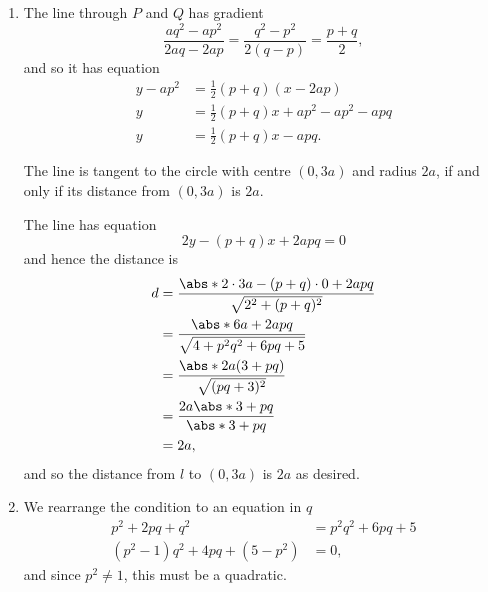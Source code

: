 \Question{\currfilebase}

\begin{enumerate}
    \item The line through \(P\) and \(Q\) has gradient
          \[
              \frac{aq^2 - ap^2}{2aq - 2ap} = \frac{q^2 - p^2}{2 (q - p)} = \frac{p + q}{2},
          \]
          and so it has equation
          \begin{align*}
              y - ap^2 & = \frac{1}{2} (p + q) (x - 2ap)             \\
              y        & = \frac{1}{2} (p + q) x + ap^2 - ap^2 - apq \\
              y        & = \frac{1}{2} (p + q) x - apq.
          \end{align*}

          The line is tangent to the circle with centre \((0, 3a)\) and radius \(2a\), if and only if its distance from \((0, 3a)\) is \(2a\).

          The line has equation
          \[
              2y - (p + q) x + 2apq = 0
          \]
          and hence the distance is
          \begin{align*}
              d & = \frac{\abs*{2 \cdot 3a - (p + q) \cdot 0 + 2apq}}{\sqrt{2^2 + (p + q)^2}} \\
                & = \frac{\abs*{6a + 2apq}}{\sqrt{4 + p^2 q^2 + 6pq + 5}}                     \\
                & = \frac{\abs*{2a (3 + pq)}}{\sqrt{(pq + 3)^2}}                              \\
                & = \frac{2a \abs*{3 + pq}}{\abs*{3 + pq}}                                    \\
                & = 2a,
          \end{align*}
          and so the distance from \(l\) to \((0, 3a)\) is \(2a\) as desired.

    \item We rearrange the condition to an equation in \(q\)
          \begin{align*}
              p^2 + 2pq + q^2                                       & = p^2 q^2 + 6pq + 5 \\
              \left(p^2 - 1\right) q^2 + 4pq + \left(5 - p^2\right) & = 0,
          \end{align*}
          and since \(p^2 \neq 1\), this must be a quadratic.


\end{enumerate}
